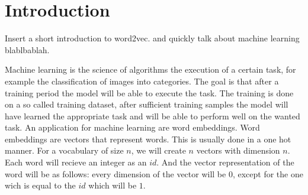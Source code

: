 \chapter{Introduction}\label{chap:introduction}

Insert a short introduction to word2vec. and quickly talk about machine learning blablbablah. 


Machine learning is the science of algorithms the execution of a certain task, for example the classification of images into categories. The goal is that after a training period the model will be able to execute the task. The training is done on a so called training dataset, after sufficient training samples the model will have learned the appropriate task and will be able to perform well on the wanted task. An application for machine learning are word embeddings. Word embeddings are vectors that represent words. This is usually done in a one hot manner. For a vocabulary of size $n$, we will create $n$ vectors with dimension $n$. Each word will recieve an integer as an $id$. And the vector representation of the word will be as follows: every dimension of the vector will be $0$, except for the one wich is equal to the $id$ which will be $1$. 














